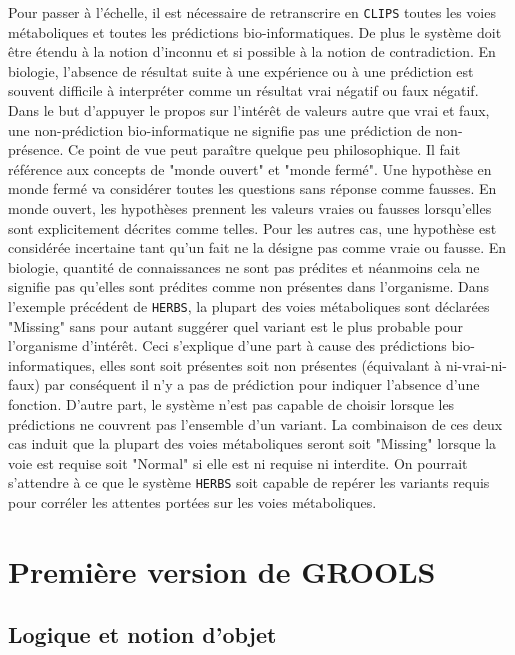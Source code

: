 \begin{refsegment}
Pour passer à l'échelle, il est nécessaire de retranscrire  en \texttt{\gls{CLIPS}}  toutes les voies métaboliques et toutes les prédictions bio-informatiques. De plus le système doit être étendu à la notion d'inconnu et si possible à la notion de contradiction. En biologie, l’absence de résultat suite à une expérience ou à une prédiction est souvent difficile à interpréter comme un résultat vrai négatif ou faux négatif.  Dans le but d'appuyer le propos sur l'intérêt de valeurs autre que vrai et faux, une non-prédiction bio-informatique ne signifie pas une prédiction de non-présence. Ce point de vue peut paraître quelque peu philosophique. Il fait référence aux concepts de "monde ouvert" et "monde fermé". Une hypothèse en monde fermé va considérer toutes les questions sans réponse comme fausses. En monde ouvert, les hypothèses prennent les valeurs vraies ou fausses lorsqu'elles sont explicitement décrites comme telles. Pour les autres cas, une hypothèse est considérée incertaine tant qu'un fait ne la désigne pas comme vraie ou fausse. En biologie, quantité de connaissances ne sont pas prédites et néanmoins cela ne signifie pas qu'elles sont prédites comme non présentes dans l'organisme. Dans l’exemple précédent de \texttt{\gls{HERBS}}, la plupart des voies métaboliques sont déclarées "Missing" sans pour autant suggérer quel variant est le plus probable pour l'organisme d'intérêt. Ceci s'explique d'une part à cause des prédictions bio-informatiques, elles sont soit présentes soit non présentes (équivalant à ni-vrai-ni-faux) par conséquent il n'y a pas de prédiction pour indiquer l'absence d'une fonction. D'autre part, le système n'est pas capable de choisir lorsque les prédictions ne couvrent pas l'ensemble d'un variant.  La combinaison de ces deux cas induit que la plupart des voies métaboliques seront soit "Missing" lorsque la voie est requise soit "Normal" si elle est ni requise ni interdite. On pourrait s’attendre à ce que le système \texttt{\gls{HERBS}} soit capable de repérer les variants requis pour corréler les attentes portées sur les voies métaboliques.

\section{Première version de GROOLS}

\subsection{Logique et notion d'objet}


\end{refsegment}
